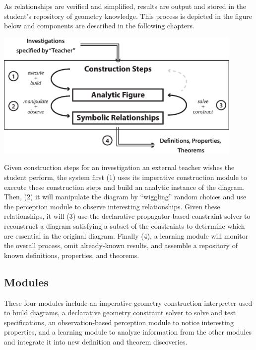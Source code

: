 As relationships are verified and simplified, results are output and
stored in the student's repository of geometry knowledge. This process
is depicted in the figure below and components are described in the
following chapters.


\newpage
\begin{center}
\includegraphics[width=0.9\textwidth]{diagrams/Representations.eps}
\end{center}

\begin{spacing}{1}
 Given construction steps for an
  investigation an external teacher wishes the student perform, the
  system first (1) uses its imperative construction module to
  execute these construction steps and build an analytic instance of
  the diagram. Then, (2) it will manipulate the diagram by
  ``wiggling'' random choices and use the perception module to observe
  interesting relationships. Given these relationships, it will (3)
  use the declarative propagator-based constraint solver to
  reconstruct a diagram satisfying a subset of the constraints to
  determine which are essential in the original diagram. Finally (4),
  a learning module will monitor the overall process, omit
  already-known results, and assemble a repository of known
  definitions, properties, and theorems.
\end{spacing}


\subsection{Modules}

These four modules include an imperative geometry construction
interpreter used to build diagrams, a declarative geometry constraint
solver to solve and test specifications, an observation-based
perception module to notice interesting properties, and a learning
module to analyze information from the other modules and integrate it
into new definition and theorem discoveries.

